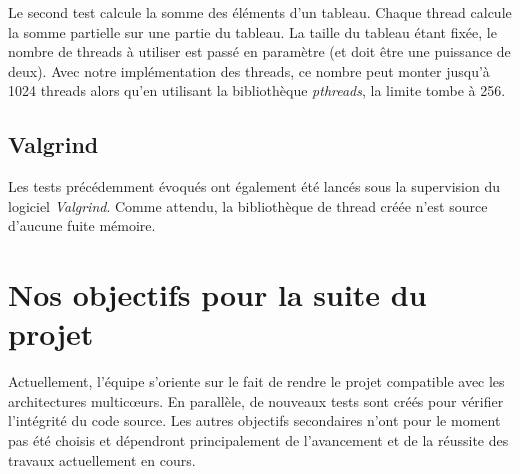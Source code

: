 \documentclass[a4paper,11pt]{article}
\begin{document}
Le second test calcule la somme des éléments d'un tableau. Chaque thread calcule  la somme partielle sur une partie du tableau. La taille du tableau étant fixée, le nombre de threads à utiliser est passé en paramètre (et doit être une puissance de deux). Avec notre implémentation des threads, ce nombre peut monter jusqu'à 1024 threads alors qu'en utilisant la bibliothèque \textit{pthreads}, la limite tombe à 256.

\subsection{Valgrind}

Les tests précédemment évoqués ont également été lancés sous la supervision du logiciel \textit{Valgrind}. Comme attendu, la bibliothèque de thread créée n'est source d'aucune fuite mémoire.

\section{Nos objectifs pour la suite du projet}

Actuellement, l'équipe s'oriente sur le fait de rendre le projet compatible avec les architectures multic\oe urs. En parallèle, de nouveaux tests sont créés pour vérifier l'intégrité du code source. Les autres objectifs secondaires n'ont pour le moment pas été choisis et dépendront principalement de l'avancement et de la réussite des travaux actuellement en cours.
\end{document}

